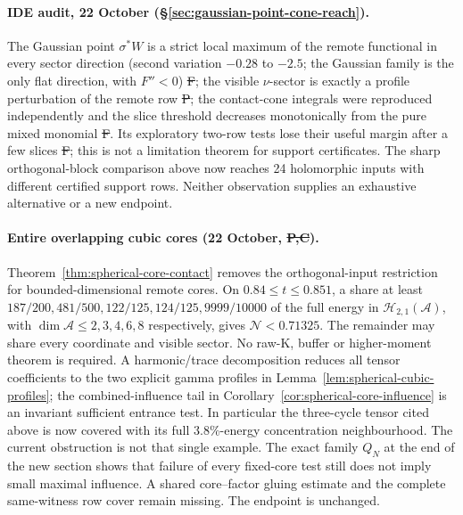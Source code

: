 \paragraph{IDE audit, 22 October (\S\ref{sec:gaussian-point-cone-reach}).}
The Gaussian point $\sigma^*W$ is a strict local maximum of the remote
functional in every sector direction (second variation $-0.28$ to
$-2.5$; the Gaussian family is the only flat direction, with $F''<0$)
\st{F}; the visible $\nu$-sector is exactly a profile perturbation of
the remote row \st{P}; the contact-cone integrals were reproduced
independently and the slice threshold decreases monotonically from the
pure mixed monomial \st{F}. Its exploratory two-row tests lose their
useful margin after a few slices \st{F}; this is not a limitation theorem
for support certificates. The sharp orthogonal-block comparison above
now reaches 24 holomorphic inputs with different certified support rows.
Neither observation supplies an exhaustive alternative or a new endpoint.

\paragraph{Entire overlapping cubic cores (22 October, \st{P,C}).}
Theorem~\ref{thm:spherical-core-contact} removes the orthogonal-input
restriction for bounded-dimensional remote cores. On
$0.84\le t\le0.851$, a share at least
$187/200,481/500,122/125,124/125,9999/10000$ of the full energy
in $\mathcal H_{2,1}(\mathcal A)$, with
$\dim\mathcal A\le2,3,4,6,8$ respectively, gives
$\mathcal N<0.71325$. The remainder may share every coordinate and
visible sector. No raw-K, buffer or higher-moment theorem is required.
A harmonic/trace decomposition reduces all tensor coefficients to the
two explicit gamma profiles in
Lemma~\ref{lem:spherical-cubic-profiles}; the combined-influence tail
in Corollary~\ref{cor:spherical-core-influence} is an invariant
sufficient entrance test. In particular the three-cycle tensor cited
above is now covered with its full $3.8\%$-energy concentration
neighbourhood. The current obstruction is not that single example.
The exact family $Q_N$ at the end of the new section shows that
failure of every fixed-core test still does not imply small maximal
influence. A shared core--factor gluing estimate and the complete
same-witness row cover remain missing. The endpoint is unchanged.


